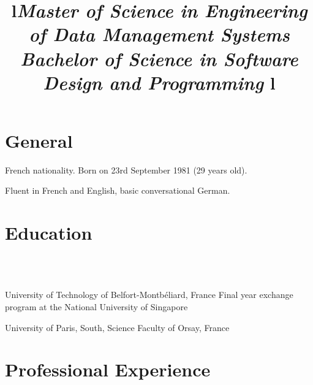 \documentclass[overlapped,line,letterpaper]{res}
\begin{document}
\begin{resume}


  \section{\bf General}
  French nationality. Born on 23rd September 1981 (29 years old).

  Fluent in French and English, basic conversational German.


  \section{\bf Education}

  \begin{format}
    \title{l}\\
    \body\\
  \end{format}

  \title{\em Master of Science in Engineering of Data Management Systems }
  \begin{position}
    University of Technology of Belfort-Montb\'{e}liard, France\newline
    Final year exchange program at the National University of Singapore
  \end{position}

  \title{\em Bachelor of Science in Software Design and Programming }
  \begin{position}
    University of Paris, South, Science Faculty of Orsay, France
  \end{position}


  \section{\bf Professional Experience}


  \begin{format}
    \title{l}\\
    \\
    \body\\
  \end{format}


\end{resume}
\end{document}
